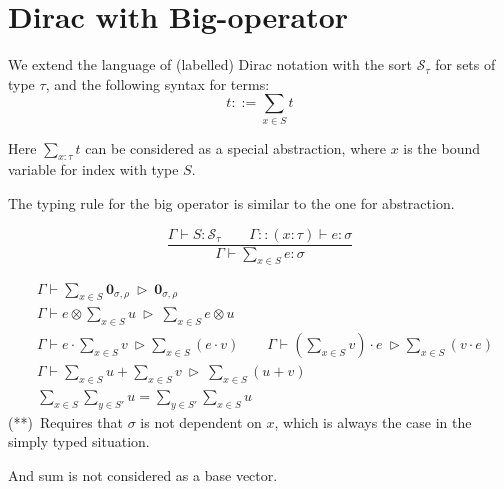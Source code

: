 \section{Dirac with Big-operator}
We extend the language of (labelled) Dirac notation with the sort $\mathcal{S}_\tau$ for sets of type $\tau$, and the following syntax for terms:
$$
t ::= \sum_{x \in S} t
$$

Here $\sum_{x : \tau} t$ can be considered as a special abstraction, where $x$ is the bound variable for index with type $S$.

\begin{definition}
  The typing rule for the big operator is similar to the one for abstraction.

  $$
  \frac{\Gamma \vdash S : \mathcal{S}_\tau\qquad \Gamma::(x : \tau) \vdash e : \sigma}{\Gamma \vdash \sum_{x \in S} e : \sigma}
  $$
  
\end{definition}

\begin{definition}
    \begin{align*}
        & \Gamma \vdash \sum_{x \in S} \mathbf{0}_{\sigma, \rho} \ \triangleright\ \mathbf{0}_{\sigma, \rho} \\
        & \Gamma \vdash e \otimes \sum_{x \in S} u \ \triangleright\ \sum_{x \in S} e \otimes u \\
        &\Gamma \vdash e\cdot \sum_{x \in S} v \ \triangleright \sum_{x \in S} (e\cdot v)
        \qquad 
        \Gamma \vdash (\sum_{x \in S} v) \cdot e\ \triangleright \sum_{x \in S} (v \cdot e)\\        
        & \Gamma \vdash \sum_{x \in S} u + \sum_{x \in S} v  \ \triangleright\ \sum_{x \in S} (u + v) \\
        \tag{**}
        & \sum_{x \in S} \sum_{y \in S'} u = \sum_{y \in S'} \sum_{x \in S} u
    \end{align*}
(**)\ Requires that $\sigma$ is not dependent on $x$, which is always the case in the simply typed situation.

And sum is not considered as a base vector.
\end{definition}





